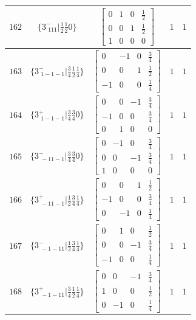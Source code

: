 \documentclass[fleqn,8pt]{jsarticle}
\begin{document}
\begin{longtable}{ccccc}
$ 162 $ & $ \{3^{-}_{\,\,111}|\frac{1}{2} \frac{1}{2} 0\} $ & $ \begin{bmatrix} 0 & 1 & 0 & \frac{1}{2} \\ 0 & 0 & 1 & \frac{1}{2} \\ 1 & 0 & 0 & 0 \end{bmatrix} $ & $ 1 $ & $ 1 $ \\ \hline
$ 163 $ & $ \{3^{-}_{\,\,1-1-1}|\frac{3}{4} \frac{1}{2} \frac{1}{4}\} $ & $ \begin{bmatrix} 0 & -1 & 0 & \frac{3}{4} \\ 0 & 0 & 1 & \frac{1}{2} \\ -1 & 0 & 0 & \frac{1}{4} \end{bmatrix} $ & $ 1 $ & $ 1 $ \\ \hline
$ 164 $ & $ \{3^{+}_{\,\,1-1-1}|\frac{3}{4} \frac{3}{4} 0\} $ & $ \begin{bmatrix} 0 & 0 & -1 & \frac{3}{4} \\ -1 & 0 & 0 & \frac{3}{4} \\ 0 & 1 & 0 & 0 \end{bmatrix} $ & $ 1 $ & $ 1 $ \\ \hline
$ 165 $ & $ \{3^{-}_{\,\,-11-1}|\frac{3}{4} \frac{3}{4} 0\} $ & $ \begin{bmatrix} 0 & -1 & 0 & \frac{3}{4} \\ 0 & 0 & -1 & \frac{3}{4} \\ 1 & 0 & 0 & 0 \end{bmatrix} $ & $ 1 $ & $ 1 $ \\ \hline
$ 166 $ & $ \{3^{+}_{\,\,-11-1}|\frac{1}{2} \frac{3}{4} \frac{1}{4}\} $ & $ \begin{bmatrix} 0 & 0 & 1 & \frac{1}{2} \\ -1 & 0 & 0 & \frac{3}{4} \\ 0 & -1 & 0 & \frac{1}{4} \end{bmatrix} $ & $ 1 $ & $ 1 $ \\ \hline
$ 167 $ & $ \{3^{-}_{\,\,-1-11}|\frac{1}{2} \frac{3}{4} \frac{1}{4}\} $ & $ \begin{bmatrix} 0 & 1 & 0 & \frac{1}{2} \\ 0 & 0 & -1 & \frac{3}{4} \\ -1 & 0 & 0 & \frac{1}{4} \end{bmatrix} $ & $ 1 $ & $ 1 $ \\ \hline
$ 168 $ & $ \{3^{+}_{\,\,-1-11}|\frac{3}{4} \frac{1}{2} \frac{1}{4}\} $ & $ \begin{bmatrix} 0 & 0 & -1 & \frac{3}{4} \\ 1 & 0 & 0 & \frac{1}{2} \\ 0 & -1 & 0 & \frac{1}{4} \end{bmatrix} $ & $ 1 $ & $ 1 $ \\ \hline

\end{longtable}
\end{document}

